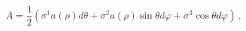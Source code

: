 \begin{equation}
\label{last2}
 A=\frac{1}{2}\left(\sigma^1 a(\rho) d\theta+\sigma^2 a(\rho)\sin\theta d\varphi
+\sigma^3 \cos\theta d\varphi \right)\,,
\end{equation}

